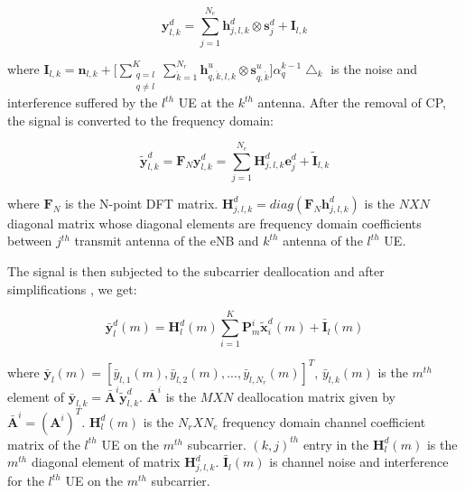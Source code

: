 \documentclass[conference]{IEEEtran}
\begin{document}
 \begin{equation}
       \label{six}
 \mathbf{y}^d_{l,k}= \sum_{j=1}^{N_e} \mathbf{h}^d_{j,l,k} \otimes \mathbf{s}^d_j + \mathbf{I}_{l,k} 
       \end{equation} 
       
where $\mathbf{I}_{l,k} = \mathbf{n}_{l,k} + \Big [ \sum_{\substack{ q=l \\ q \neq l}}^{K} \sum_{\acute{k}=1}^{N_r} \mathbf{h}^u_{q,\acute{k},l,k} \otimes \mathbf{s}^u_{q,\acute{k}} \Big ] \alpha^{k-1}_{q}  \bigtriangleup_k  $ is the noise and interference suffered by the $l^{th}$ UE at the $k^{th}$ antenna. After the removal of CP, the signal is converted to the frequency domain: 

                                                                   
       \begin{equation}
       \label{seven}
      \mathbf{\tilde{y}}^d_{l,k}= \mathbf{F}_N \mathbf{y}^d_{l,k}  
      =\sum_{j=1}^{N_e} \mathbf{{H}}^d_{j,l,k} \mathbf{e}^d_j + \mathbf{\tilde{I}}_{l,k}  
       \end{equation}
       
where $\mathbf{F}_N$ is the N-point DFT matrix. ${\mathbf{H}}^d_{j,l,k} = diag(\mathbf{F}_N \mathbf{h}^d_{j,l,k})$ is the $N X N$ diagonal matrix whose diagonal elements are frequency domain coefficients between $j^{th}$ transmit antenna of the eNB and $k^{th}$ antenna of the $l^{th}$ UE. 

The signal is then subjected to the subcarrier deallocation and after simplifications \cite{ants,sc_fdma}, we get:

   \begin{equation}
       \label{eight}
     \mathbf{\bar{y}}^d_l (m) =  \mathbf{H}^d_l (m) \sum_{i=1}^{K} \mathbf{P}^i_m \mathbf{\tilde{x}}^d_i (m) + \mathbf{\bar{I}}_l (m)
       \end{equation}

where $\mathbf{\bar{y}}_l (m) = [\bar{y}_{l,1}(m), \bar{y}_{l,2}(m),...,\bar{y}_{l,N_r}(m)]^T$, $\bar{y}_{l,k}(m)$ is the $m^{th}$ element of $\mathbf{\bar{y}}_{l,k} = \mathbf{\bar{A}}^i \mathbf{\tilde{y}}^d_{l,k}$. $\mathbf{\bar{A}}^i$ is the $M X N$ deallocation matrix given by $\mathbf{\bar{A}}^i = (\mathbf{A}^i)^T$. $\mathbf{H}^d_l (m)$  is the $N_r X N_e$ frequency domain channel coefficient matrix of the $l^{th}$ UE on the $m^{th}$ subcarrier. $(k,j)^{th}$ entry in the $\mathbf{H}^d_l (m)$ is the $m^{th}$ diagonal element of matrix $\mathbf{{H}}^d_{j,l,k}$. $\mathbf{\bar{I}}_l (m)$  is channel noise and interference for the $l^{th}$ UE on the $m^{th}$ subcarrier. 
\end{document}
